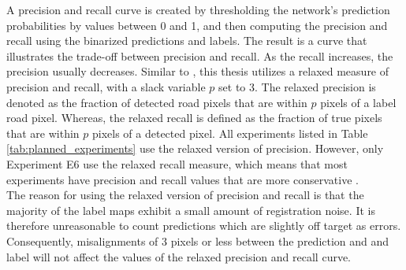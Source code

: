A precision and recall curve is created by thresholding the network's prediction probabilities by values between 0 and 1, and then computing the precision and recall using the binarized predictions and labels. The result is a curve that illustrates the trade-off between precision and recall. As the recall increases, the precision usually decreases. Similar to \citep{Mnih_aerial_images_noisy}, this thesis utilizes a relaxed measure of precision and recall, with a slack variable $p$ set to 3. The relaxed precision is denoted as the fraction of detected road pixels that are within $p$ pixels of a label road pixel. Whereas, the relaxed recall is defined as the fraction of true pixels that are within $p$ pixels of a detected pixel. All experiments listed in Table \ref{tab:planned_experiments} use the relaxed version of precision. However, only Experiment E6 use the relaxed recall measure, which means that most experiments have precision and recall values that are more conservative .\\

The reason for using the relaxed version of precision and recall is that the majority of the label maps exhibit a small amount of registration noise. It is therefore unreasonable to count predictions which are slightly off target as errors. Consequently, misalignments of 3 pixels or less between the prediction and and label will not affect the values of the relaxed precision and recall curve.\\




